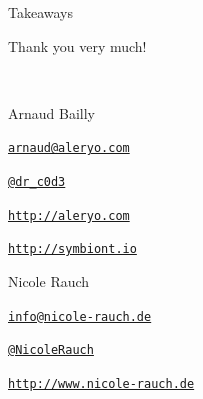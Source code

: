 \begin{frame}[fragile]{Takeaways}
\end{frame}

\begin{frame}{Thank you very much!}

  ~\\[1em]
  \begin{block}{Arnaud Bailly}
        \begin{description}[Twitterxx]
        \item[E-Mail]  \href{mailto:arnaud@aleryo.com}{\texttt{arnaud@aleryo.com}}
        \item[Twitter] \href{http://twitter.com/NicoleRauch}{\texttt{@dr\_c0d3}}
        \item[Web] \href{http://aleryo.com}{\texttt{http://aleryo.com}}
        \item[Web] \href{http://symbiont.io}{\texttt{http://symbiont.io}}
        \end{description}
  \end{block}
  \begin{block}{Nicole Rauch}
    \begin{description}[Twitterxx]
    \item[E-Mail]  \href{mailto:info@nicole-rauch.de}{\texttt{info@nicole-rauch.de}}
    \item[Twitter] \href{http://twitter.com/NicoleRauch}{\texttt{@NicoleRauch}}
    \item[Web] \href{http://www.nicole-rauch.de}{\texttt{http://www.nicole-rauch.de}}
    \end{description}
  \end{block}
\end{frame}

